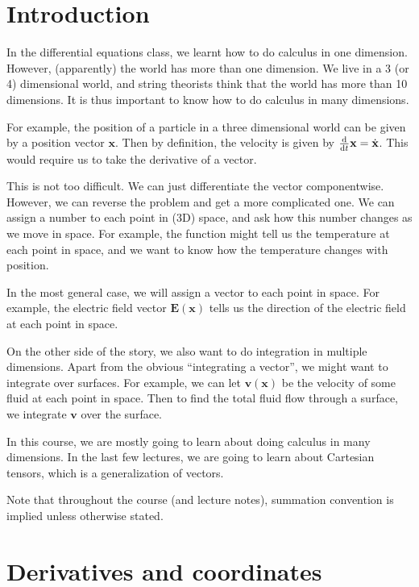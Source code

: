 \documentclass[a4paper]{article}
\begin{document}
\tableofcontents

\setcounter{section}{-1}
\section{Introduction}
In the differential equations class, we learnt how to do calculus in one dimension. However, (apparently) the world has more than one dimension. We live in a 3 (or 4) dimensional world, and string theorists think that the world has more than 10 dimensions. It is thus important to know how to do calculus in many dimensions.

For example, the position of a particle in a three dimensional world can be given by a position vector $\mathbf{x}$. Then by definition, the velocity is given by $\frac{\mathrm{d}}{\mathrm{d} t} \mathbf{x} = \dot{\mathbf{x}}$. This would require us to take the derivative of a vector.

This is not too difficult. We can just differentiate the vector componentwise. However, we can reverse the problem and get a more complicated one. We can assign a number to each point in (3D) space, and ask how this number changes as we move in space. For example, the function might tell us the temperature at each point in space, and we want to know how the temperature changes with position.

In the most general case, we will assign a vector to each point in space. For example, the electric field vector $\mathbf{E}(\mathbf{x})$ tells us the direction of the electric field at each point in space.

On the other side of the story, we also want to do integration in multiple dimensions. Apart from the obvious ``integrating a vector'', we might want to integrate over surfaces. For example, we can let $\mathbf{v}(\mathbf{x})$ be the velocity of some fluid at each point in space. Then to find the total fluid flow through a surface, we integrate $\mathbf{v}$ over the surface.

In this course, we are mostly going to learn about doing calculus in many dimensions. In the last few lectures, we are going to learn about Cartesian tensors, which is a generalization of vectors.

Note that throughout the course (and lecture notes), summation convention is implied unless otherwise stated.

\section{Derivatives and coordinates}
\end{document}
